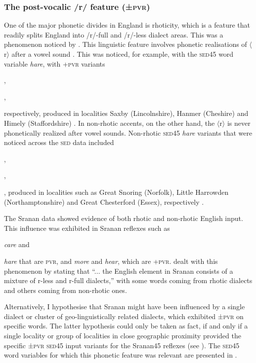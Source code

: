 {\subsubsection{The post-vocalic /r/ feature (±\textsc{pvr})} \label{3.3.2.2}
One of the major phonetic divides in England is rhoticity, which is a feature that readily splits England into /r/-full and /r/-less dialect areas. This was a phenomenon noticed by \citet{Wells82}. This linguistic feature involves phonetic realisations of $\langle$r$\rangle$ after a vowel sound \citep{Roca99}. This was noticed, for example, with the \textsc{sed45} word variable \emph{hare}, with +\textsc{pvr} variants {\textipa{[E@r]}, {\textipa{[E:r]}, {\textipa{[he:@\:r]} respectively, produced in localities Saxby (Lincolnshire), Hanmer (Cheshire) and Himely (Staffordshire) \citep{Orton70b}. In non-rhotic accents, on the other hand, the $\langle$r$\rangle$ is never phonetically realized after vowel sounds. Non-rhotic \textsc{sed45} \emph{hare} variants that were noticed across the \textsc{sed} data included {\textipa{[hE@]}, {\textipa{[E:r]}, {\textipa{[e@]}, produced in localities such as Great Snoring (Norfolk), Little Harrowden (Northamptonshire) and Great Chesterford (Essex), respectively \citep{Orton70}.

The Sranan data showed evidence of both rhotic and non-rhotic English input. This influence was exhibited in Sranan reflexes such as {\textipa{[ke]} \emph{care} and {\textipa{[he]} \emph{hare} that are \textminus\textsc{pvr}, and  \textipa{[moro]} \emph{more} and \textipa{[jeri]} \emph{hear}, which are +\textsc{pvr}. \citet[30]{Smith87} dealt with this phenomenon by stating that ``... the English element in Sranan consists of a mixture of r-less and r-full dialects,'' with some words coming from rhotic dialects and others coming from non-rhotic ones.

Alternatively, I hypothesise that Sranan might have been influenced by a single dialect or cluster of geo-linguistically related dialects, which exhibited ±\textsc{pvr} on specific words. The latter hypothesis could only be taken as fact, if and only if a single locality or group of localities in close geographic proximity provided the specific ±\textsc{pvr} \textsc{sed45} input variants for the Sranan45 reflexes (see ). The \textsc{sed45} word variables for which this phonetic feature was relevant are presented in .

}}}}}}}}}
